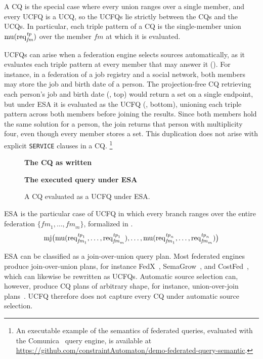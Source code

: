 A \ac{CQ} is the special case where every union ranges over a single member, and every \ac{UCFQ} is a \ac{UCQ}, so the \acp{UCFQ} lie strictly between the \acp{CQ} and the \acp{UCQ}.
In particular, each triple pattern of a \ac{CQ} is the single-member union $\operatorname{mu}(\operatorname{req}_{\mathit{fm}}^{\mathit{tp}})$ over the member $\mathit{fm}$ at which it is evaluated.

\acp{UCFQ} can arise when a federation engine selects sources automatically, as it evaluates each triple pattern at every member that may answer it ().
For instance, in a federation of a job registry and a social network, both members may store the job and birth date of a person.
The projection-free \ac{CQ} retrieving each person's job and birth date (, top) would return a set on a single endpoint, but under \ac{ESA} it is evaluated as the \ac{UCFQ} (, bottom), unioning each triple pattern across both members before joining the results.
Since both members hold the same solution for a person, the join returns that person with multiplicity four, even though every member stores a set. This duplication does not arise with explicit \texttt{SERVICE} clauses in a \ac{CQ}.%
\footnote{An executable example of the semantics of federated queries, evaluated with the Comunica~\cite{taelman_iswc_resources_comunica_2018} query engine, is available at \url{https://github.com/constraintAutomaton/demo-federated-query-semantic}.}

\begin{figure}[!t]
  \textbf{The \ac{CQ} as written}
  
  \textbf{The executed query under \ac{ESA}}
  
  \caption{A \ac{CQ} evaluated as a \ac{UCFQ} under \ac{ESA}.}
  \label{fig:ucfq-example}
\end{figure}

\ac{ESA} is the particular case of \ac{UCFQ} in which every branch ranges over the entire federation $\{\mathit{fm}_1, \dots, \mathit{fm}_m\}$, formalized in .
\begin{equation}
  \operatorname{mj}\bigl(\operatorname{mu}(\operatorname{req}_{\mathit{fm}_1}^{\mathit{tp}_1}, \dots, \operatorname{req}_{\mathit{fm}_m}^{\mathit{tp}_1}), \dots, \operatorname{mu}(\operatorname{req}_{\mathit{fm}_1}^{\mathit{tp}_n}, \dots, \operatorname{req}_{\mathit{fm}_m}^{\mathit{tp}_n})\bigr)
  \label{eq_esa}
\end{equation}

\ac{ESA} can be classified as a join-over-union query plan.
Most federated engines produce join-over-union plans, for instance FedX~\cite{schwarte2011fedx}, SemaGrow~\cite{charalambidis2015semagrow}, and CostFed~\cite{saleem2018costfed}, which can likewise be rewritten as \acp{UCFQ}.
Automatic source selection can, however, produce \ac{CQ} plans of arbitrary shape, for instance, union-over-join plans~\cite{aimonier2024fedup}.
\ac{UCFQ} therefore does not capture every \ac{CQ} under automatic source selection.

